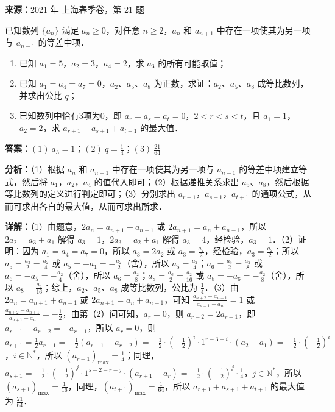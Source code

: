 \begin{question}[points=18]
\textbf{来源：}2021 年 上海春季卷，第 21 题\par
已知数列 $\{a_n\}$ 满足 $a_n\ge 0$，对任意 $n\ge 2$，$a_n$ 和 $a_{n+1}$ 中存在一项使其为另一项与 $a_{n-1}$ 的等差中项．\begin{enumerate}\item[(1)] 已知 $a_1=5$，$a_2=3$，$a_4=2$，求 $a_3$ 的所有可能取值；\item[(2)] 已知 $a_1=a_4=a_7=0$，$a_2$、$a_5$、$a_8$ 为正数，求证：$a_2$、$a_5$、$a_8$ 成等比数列，并求出公比 $q$；\item[(3)] 已知数列中恰有3项为0，即 $a_r=a_s=a_t=0$，$2<r<s<t$，且 $a_1=1$，$a_2=2$，求 $a_{r+1}+a_{s+1}+a_{t+1}$ 的最大值．\end{enumerate}
\begin{solution}
\textbf{答案：}$(1)\ a_3=1$；$(2)\ q=\frac{1}{4}$；$(3)\ \frac{21}{64}$

\textbf{分析：}（1）根据 $a_n$ 和 $a_{n+1}$ 中存在一项使其为另一项与 $a_{n-1}$ 的等差中项建立等式，然后将 $a_1$，$a_2$，$a_4$ 的值代入即可；\newline（2）根据递推关系求出 $a_5$、$a_8$，然后根据等比数列的定义进行判定即可；\newline（3）分别求出 $a_{r+1}$，$a_{s+1}$，$a_{t+1}$ 的通项公式，从而可求出各自的最大值，从而可求出所求．

\textbf{详解：}（1）由题意，$2a_n=a_{n+1}+a_{n-1}$ 或 $2a_{n+1}=a_n+a_{n-1}$，所以 $2a_2=a_3+a_1$ 解得 $a_3=1$，$2a_3=a_2+a_1$ 解得 $a_3=4$，经检验，$a_3=1$．\newline（2）证明：因为 $a_1=a_4=a_7=0$，所以 $a_3=2a_2$ 或 $a_3=\frac{a_2}{2}$，经检验，$a_3=\frac{a_2}{2}$；所以 $a_5=\frac{a_3}{2}=\frac{a_2}{4}$ 或 $a_5=-a_1=-\frac{a_2}{2}$（舍），所以 $a_5=\frac{a_2}{4}$；$a_6=\frac{a_5}{2}=\frac{a_2}{8}$ 或 $a_6=-a_5=-\frac{a_2}{4}$（舍），所以 $a_6=\frac{a_2}{8}$；$a_8=\frac{a_6}{2}=\frac{a_2}{16}$ 或 $a_8=-a_6=-\frac{a_2}{8}$（舍），所以 $a_8=\frac{a_2}{16}$；综上，$a_2$、$a_5$、$a_8$ 成等比数列，公比为 $\frac{1}{4}$．\newline（3）由 $2a_n=a_{n+1}+a_{n-1}$ 或 $2a_{n+1}=a_n+a_{n-1}$，可知 $\frac{a_{n+2}-a_{n+1}}{a_{n+1}-a_n}=1$ 或 $\frac{a_{n+2}-a_{n+1}}{a_{n+1}-a_n}=-\frac{1}{2}$，由第（2）问可知，$a_r=0$，则 $a_{r-2}=2a_{r-1}$，即 $a_{r-1}-a_{r-2}=-a_{r-1}$，所以 $a_r=0$，则 $a_{r+1}=\frac{1}{2}a_{r-1}=-\frac{1}{2}(a_{r-1}-a_{r-2})=-\frac{1}{2}\cdot(-\frac{1}{2})^i\cdot 1^{r-3-i}\cdot(a_2-a_1)=-\frac{1}{2}\cdot(-\frac{1}{2})^i$，$i\in\mathbb{N}^*$，所以 $(a_{r+1})_{\max}=\frac{1}{4}$；同理，$a_{s+1}=-\frac{1}{2}\cdot(-\frac{1}{2})^j\cdot 1^{s-2-r-j}\cdot(a_{r+1}-a_r)=-\frac{1}{2}\cdot(-\frac{1}{2})^j\cdot\frac{1}{4}$，$j\in\mathbb{N}^*$，所以 $(a_{s+1})_{\max}=\frac{1}{16}$，同理，$(a_{t+1})_{\max}=\frac{1}{64}$，所以 $a_{r+1}+a_{s+1}+a_{t+1}$ 的最大值为 $\frac{21}{64}$．
\end{solution}
\end{question}

